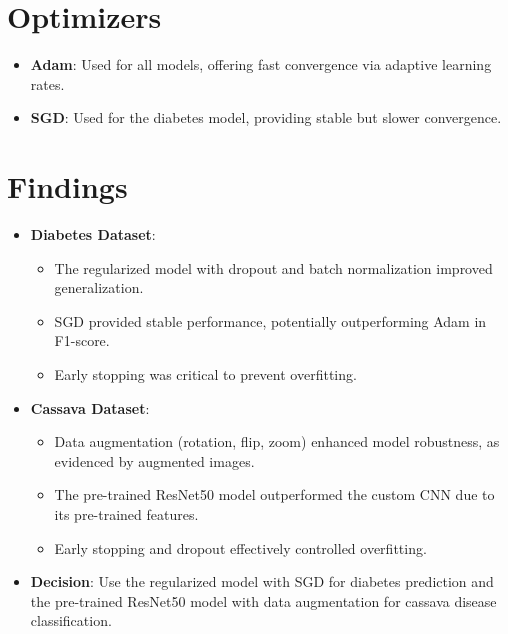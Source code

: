 \documentclass[a4paper,12pt]{article}
\begin{document}
\section*{Optimizers}
\begin{itemize}
    \item \textbf{Adam}: Used for all models, offering fast convergence via adaptive learning rates.
    \item \textbf{SGD}: Used for the diabetes model, providing stable but slower convergence.
\end{itemize}

\section*{Findings}
\begin{itemize}
    \item \textbf{Diabetes Dataset}:
    \begin{itemize}
        \item The regularized model with dropout and batch normalization improved generalization.
        \item SGD provided stable performance, potentially outperforming Adam in F1-score.
        \item Early stopping was critical to prevent overfitting.
    \end{itemize}
    \item \textbf{Cassava Dataset}:
    \begin{itemize}
        \item Data augmentation (rotation, flip, zoom) enhanced model robustness, as evidenced by augmented images.
        \item The pre-trained ResNet50 model outperformed the custom CNN due to its pre-trained features.
        \item Early stopping and dropout effectively controlled overfitting.
    \end{itemize}
    \item \textbf{Decision}: Use the regularized model with SGD for diabetes prediction and the pre-trained ResNet50 model with data augmentation for cassava disease classification.
\end{itemize}

\clearpage
\end{document}
